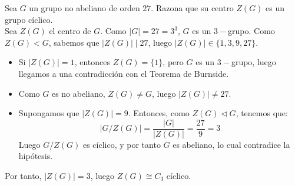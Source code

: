 \documentclass[12pt]{article}
\begin{document}
    \begin{ejercicio}
        Sea $G$ un grupo no abeliano de orden $27$. Razona que su centro $Z(G)$ es un grupo cíclico.\\

        Sea $Z(G)$ el centro de $G$. Como $|G|=27=3^3$, $G$ es un $3-$grupo. Como $Z(G)<G$, sabemos que $|Z(G)|\mid 27$, luego $|Z(G)|\in \{1,3,9,27\}$.
        \begin{itemize}
            \item Si $|Z(G)|=1$, entonces $Z(G)=\{1\}$, pero $G$ es un $3-$grupo, luego llegamos a una contradicción con el Teorema de Burnside.
            \item Como $G$ es no abeliano, $Z(G)\neq G$, luego $|Z(G)|\neq 27$.
            \item Supongamos que $|Z(G)|=9$. Entonces, como $Z(G)\lhd G$, tenemos que:
            \begin{equation*}
                |G/Z(G)| = \frac{|G|}{|Z(G)|} = \frac{27}{9} = 3
            \end{equation*}
            Luego $G/Z(G)$ es cíclico, y por tanto $G$ es abeliano, lo cual contradice la hipótesis.
        \end{itemize}

        Por tanto, $|Z(G)|=3$, luego $Z(G)\cong C_3$ cíclico.
    \end{ejercicio}
\end{document}
